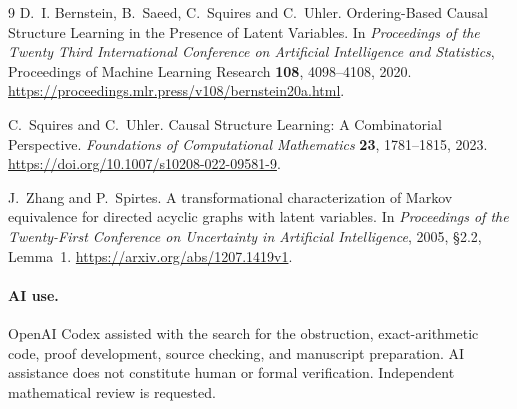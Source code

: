 \documentclass[11pt]{article}
\begin{document}
\begin{thebibliography}{9}
D.~I. Bernstein, B.~Saeed, C.~Squires and C.~Uhler.
\newblock Ordering-Based Causal Structure Learning in the Presence of Latent Variables.
\newblock In \emph{Proceedings of the Twenty Third International Conference
on Artificial Intelligence and Statistics}, Proceedings of Machine Learning
Research \textbf{108}, 4098--4108, 2020.
\newblock \url{https://proceedings.mlr.press/v108/bernstein20a.html}.

C.~Squires and C.~Uhler.
\newblock Causal Structure Learning: A Combinatorial Perspective.
\newblock \emph{Foundations of Computational Mathematics} \textbf{23},
1781--1815, 2023.
\newblock \url{https://doi.org/10.1007/s10208-022-09581-9}.

J.~Zhang and P.~Spirtes.
\newblock A transformational characterization of Markov equivalence for
directed acyclic graphs with latent variables.
\newblock In \emph{Proceedings of the Twenty-First Conference on Uncertainty
in Artificial Intelligence}, 2005, \S2.2, Lemma~1.
\newblock \url{https://arxiv.org/abs/1207.1419v1}.
\end{thebibliography}

\paragraph{AI use.}
OpenAI Codex assisted with the search for the obstruction, exact-arithmetic
code, proof development, source checking, and manuscript preparation.
AI assistance does not constitute human or formal verification.
Independent mathematical review is requested.
\end{document}
